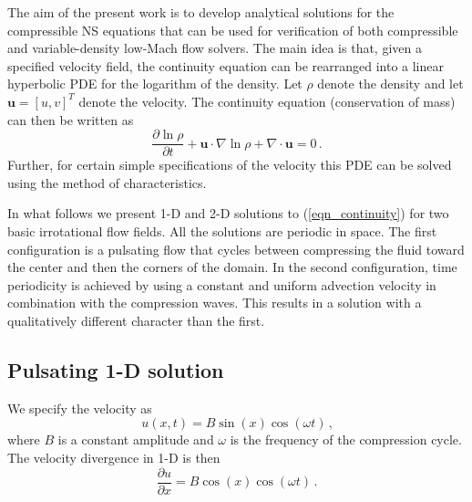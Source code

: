 \documentclass[11pt]{book}
\begin{document}
The aim of the present work is to develop analytical solutions for the compressible NS equations that can be used for verification of both compressible and variable-density low-Mach flow solvers.  The main idea is that, given a specified velocity field, the continuity equation can be rearranged into a linear hyperbolic PDE for the logarithm of the density.  Let $\rho$ denote the density and let $\mathbf{u} = [u,v]^T$ denote the velocity. The continuity equation (conservation of mass) can then be written as
\begin{equation}
\label{eqn_continuity}
\frac{\partial \ln \rho}{\partial t} + \mathbf{u} \cdot \nabla \ln \rho + \nabla\cdot \mathbf{u} = 0 \,\mbox{.}
\end{equation}
Further, for certain simple specifications of the velocity this PDE can be solved using the method of characteristics.

In what follows we present 1-D and 2-D solutions to (\ref{eqn_continuity}) for two basic irrotational flow fields.  All the solutions are periodic in space.  The first configuration is a pulsating flow that cycles between compressing the fluid toward the center and then the corners of the domain.  In the second configuration, time periodicity is achieved by using a constant and uniform advection velocity in combination with the compression waves.  This results in a solution with a qualitatively different character than the first.

\subsection{Pulsating 1-D solution}
\label{soln_1d}

We specify the velocity as
\begin{equation}
\label{eqn_velocity1d}
u(x,t)  = B \sin(x) \cos(\omega t) \,\mbox{,}
\end{equation}
where $B$ is a constant amplitude and $\omega$ is the frequency of the compression cycle. The velocity divergence in 1-D is then
\begin{equation}
\label{eqn_pdesource1d}
\frac{\partial u}{\partial x} = B \cos(x) \cos(\omega t) \,\mbox{.}
\end{equation}
\end{document}

